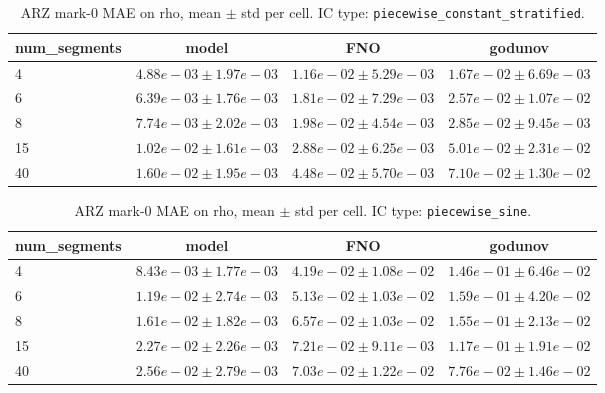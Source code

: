 
\begin{table}[h]
\centering
\caption{ARZ mark-0 MAE on rho, mean $\pm$ std per cell. IC type: \texttt{piecewise_constant_stratified}.}
\label{tab:arz_mark0_paper_eval_piecewise_constant_stratified}
\begin{tabular}{lccc}
\hline
num\_segments & model & FNO & godunov \\
\hline
4 & $4.88e-03 \pm 1.97e-03$ & $1.16e-02 \pm 5.29e-03$ & $1.67e-02 \pm 6.69e-03$ \\
6 & $6.39e-03 \pm 1.76e-03$ & $1.81e-02 \pm 7.29e-03$ & $2.57e-02 \pm 1.07e-02$ \\
8 & $7.74e-03 \pm 2.02e-03$ & $1.98e-02 \pm 4.54e-03$ & $2.85e-02 \pm 9.45e-03$ \\
15 & $1.02e-02 \pm 1.61e-03$ & $2.88e-02 \pm 6.25e-03$ & $5.01e-02 \pm 2.31e-02$ \\
40 & $1.60e-02 \pm 1.95e-03$ & $4.48e-02 \pm 5.70e-03$ & $7.10e-02 \pm 1.30e-02$ \\
\hline
\end{tabular}
\end{table}

\begin{table}[h]
\centering
\caption{ARZ mark-0 MAE on rho, mean $\pm$ std per cell. IC type: \texttt{piecewise_sine}.}
\label{tab:arz_mark0_paper_eval_piecewise_sine}
\begin{tabular}{lccc}
\hline
num\_segments & model & FNO & godunov \\
\hline
4 & $8.43e-03 \pm 1.77e-03$ & $4.19e-02 \pm 1.08e-02$ & $1.46e-01 \pm 6.46e-02$ \\
6 & $1.19e-02 \pm 2.74e-03$ & $5.13e-02 \pm 1.03e-02$ & $1.59e-01 \pm 4.20e-02$ \\
8 & $1.61e-02 \pm 1.82e-03$ & $6.57e-02 \pm 1.03e-02$ & $1.55e-01 \pm 2.13e-02$ \\
15 & $2.27e-02 \pm 2.26e-03$ & $7.21e-02 \pm 9.11e-03$ & $1.17e-01 \pm 1.91e-02$ \\
40 & $2.56e-02 \pm 2.79e-03$ & $7.03e-02 \pm 1.22e-02$ & $7.76e-02 \pm 1.46e-02$ \\
\hline
\end{tabular}
\end{table}

